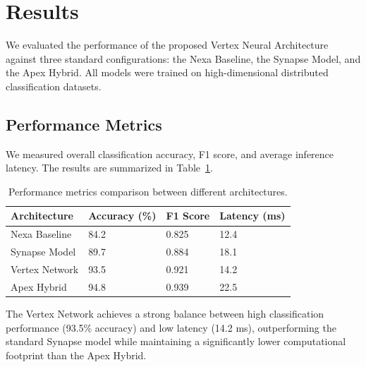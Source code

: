 \section{Results}
\label{sec:results}

We evaluated the performance of the proposed Vertex Neural Architecture against three standard configurations: the Nexa Baseline, the Synapse Model, and the Apex Hybrid. All models were trained on high-dimensional distributed classification datasets.

\subsection{Performance Metrics}
We measured overall classification accuracy, F1 score, and average inference latency. The results are summarized in Table~\ref{tab:results}.

\begin{table}[htbp]
\centering
\caption{Performance metrics comparison between different architectures.}
\label{tab:results}
\vspace{0.2cm}
\begin{tabularx}{\textwidth}{lXXX}
\toprule
\textbf{Architecture} & \textbf{Accuracy (\%)} & \textbf{F1 Score} & \textbf{Latency (ms)} \\
\midrule
Nexa Baseline & 84.2 & 0.825 & 12.4 \\
Synapse Model & 89.7 & 0.884 & 18.1 \\
Vertex Network & 93.5 & 0.921 & 14.2 \\
Apex Hybrid   & 94.8 & 0.939 & 22.5 \\
\bottomrule
\end{tabularx}
\end{table}

The Vertex Network achieves a strong balance between high classification performance (93.5\% accuracy) and low latency (14.2 ms), outperforming the standard Synapse model while maintaining a significantly lower computational footprint than the Apex Hybrid.
